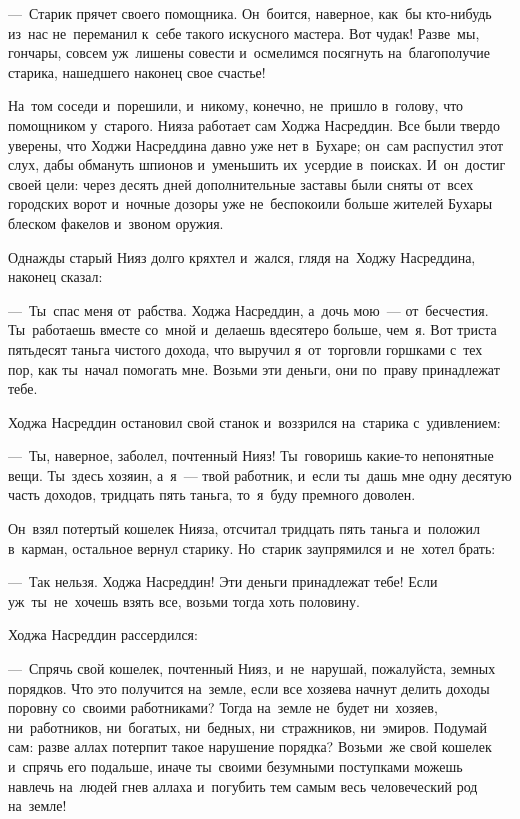 \documentclass[12pt,a4paper]{book}
\begin{document}
—~Старик прячет своего помощника. Он~боится, наверное, как~бы кто-нибудь из~нас не~переманил к~себе такого искусного мастера. Вот чудак! Разве~мы, гончары, совсем уж~лишены совести и~осмелимся посягнуть на~благополучие старика, нашедшего наконец свое счастье!

На~том соседи и~порешили, и~никому, конечно, не~пришло в~голову, что помощником у~старого. Нияза работает сам Ходжа Насреддин. Все были твердо уверены, что Ходжи Насреддина давно уже нет в~Бухаре; он~сам распустил этот слух, дабы обмануть шпионов и~уменьшить их~усердие в~поисках. И~он~достиг своей цели: через десять дней дополнительные заставы были сняты от~всех городских ворот и~ночные дозоры уже не~беспокоили больше жителей Бухары блеском факелов и~звоном оружия.

Однажды старый Нияз долго кряхтел и~жался, глядя на~Ходжу Насреддина, наконец сказал:

—~Ты~спас меня от~рабства. Ходжа Насреддин, а~дочь мою~— от~бесчестия. Ты~работаешь вместе со~мной и~делаешь вдесятеро больше, чем~я. Вот триста пятьдесят таньга чистого дохода, что выручил я~от~торговли горшками с~тех пор, как ты~начал помогать мне. Возьми эти деньги, они по~праву принадлежат тебе.

Ходжа Насреддин остановил свой станок и~воззрился на~старика с~удивлением:

—~Ты, наверное, заболел, почтенный Нияз! Ты~говоришь какие-то непонятные вещи. Ты~здесь хозяин, а~я~— твой работник, и~если ты~дашь мне одну десятую часть доходов, тридцать пять таньга, то~я~буду премного доволен.

Он~взял потертый кошелек Нияза, отсчитал тридцать пять таньга и~положил в~карман, остальное вернул старику. Но~старик заупрямился и~не~хотел брать:

—~Так нельзя. Ходжа Насреддин! Эти деньги принадлежат тебе! Если уж~ты~не~хочешь взять все, возьми тогда хоть половину.

Ходжа Насреддин рассердился:

—~Спрячь свой кошелек, почтенный Нияз, и~не~нарушай, пожалуйста, земных порядков. Что это получится на~земле, если все хозяева начнут делить доходы поровну со~своими работниками? Тогда на~земле не~будет ни~хозяев, ни~работников, ни~богатых, ни~бедных, ни~стражников, ни~эмиров. Подумай сам: разве аллах потерпит такое нарушение порядка? Возьми~же свой кошелек и~спрячь его подальше, иначе ты~своими безумными поступками можешь навлечь на~людей гнев аллаха и~погубить тем самым весь человеческий род на~земле!
\end{document}
